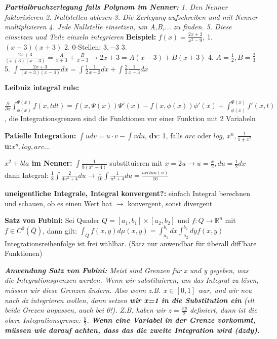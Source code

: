 \documentclass[a3paper, ngerman, 8pt]{article}
\begin{document}
\begin{multicols*}{3}
\textit{\textbf{Partialbruchzerlegung falls Polynom im Nenner:} 1. Den Nenner faktorisieren 2. Nullstellen ablesen 3. Die Zerlegung aufschreiben und mit Nenner multiplizieren 4. Jede Nullstelle einsetzen, um A,B,... zu finden. 5. Diese einsetzen und Teile einzeln integrieren}
\textbf{Beispiel: }$f(x)=\frac{2x+3}{x^2-9}$, 1. $(x-3)(x+3)$ 2. 0-Stellen: $3, -3$ 3. $\frac{2x+3}{(x+3)(x-3)}=\frac{A}{x+3}+ \frac{B}{x-3} \to 2x+3=A(x-3)+B(x+3)$ 4. $A=\frac{1}{2}, B=\frac{2}{3}$ 5. $\int\frac{2x+3}{(x+3)(x-3)}dx=\int\frac{1}{2}\frac{1}{x+3}dx+ \int\frac{2}{3}\frac{1}{x-3}dx$

\textbf{Leibniz integral rule:} 

$\frac{\partial}{\partial x}\int_{\phi (x)}^{\Psi (x)}f(x,tdt)= f(x, \Psi(x))\Psi'(x)-f(x, \phi (x))\phi'(x)+\int_{\phi (x)}^{\Psi(x)}f'(x, t)$, die Integrationsgrenzen sind die Funktionen vor einer Funktion mit 2 Variabeln

\textbf{Patielle Integration:} $\int u dv=u\cdot v -\int v du$, \textbf{dv}: 1, falls $arc$ oder $log$, $x^n, \frac{1}{1\pm x^2}$
\textbf{u:}$x^n, log, arc... $

\textbf{$x^2 + bla$ im Nenner:} $\int \frac{1}{8(x^2+4)}$ substituieren mit $x=2u \to u=\frac{x}{2}, du = \frac{1}{2}dx$ dann Integral: $\frac{1}{8}\int \frac{2}{4u^2+4}du \to \frac{1}{16} \int \frac{1}{u^2+4}du= \frac{arctan(u)}{16}$

\textbf{uneigentliche Integrale, Integral konvergent?:} einfach Integral berechnen und schauen, ob es einen Wert hat $\to$ konvergent, sonst divergent

\textbf{Satz von Fubini:} Sei Quader $Q=[a_1, b_1]\times[a_2, b_2]$ und $f: Q \to \mathbb{R}^n$ mit $f \in C^0(\bar{Q})$, dann gilt: $\int_Q f(x,y)d\mu (x, y)= \int_{a_1}^{b_1}dx\int_{a_2}^{b_2}dy f(x,y)$ Integrationsreihenfolge ist frei wählbar. (Satz nur anwendbar für überall diff'bare Funktionen)

\textit{\textbf{Anwendung Satz von Fubini:} Meist sind Grenzen für x und y gegeben, was die Integrationsgrenzen werden. Wenn wir substituieren, um das Integral zu lösen, müssen wir diese Grenzen ändern. Also wenn z.B. $x\in [0,1]$ war, und wir neu nach dz integrieren wollen, dann setzen \textbf{wir x=1 in die Substitution ein} (vlt beide Grezen anpassen, auch bei 0!). Z.B. haben wir $z=\frac{xy}{2}$ definiert, dann ist die obere Integrationsgrenze: $\frac{y}{2}$. \textbf{Wenn eine Variabel in der Grenze vorkommt, müssen wie darauf achten, dass das die zweite Integration wird (dzdy). }}


\end{multicols*}
\end{document}
